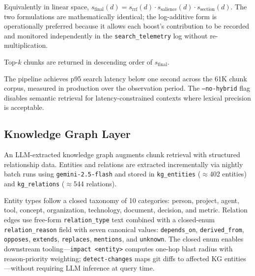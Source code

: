 Equivalently in linear space,
$s_{\text{final}}(d) = s_{\text{rrf}}(d) \cdot s_{\text{salience}}(d) \cdot s_{\text{section}}(d)$.
The two formulations are mathematically identical; the log-additive form is operationally
preferred because it allows each boost's contribution to be recorded and monitored
independently in the \texttt{search\_telemetry} log without re-multiplication.

Top-$k$ chunks are returned in descending order of $s_{\text{final}}$.

The pipeline achieves p95 search latency below one second across the 61K chunk corpus,
measured in production over the observation period. The \texttt{--no-hybrid} flag disables
semantic retrieval for latency-constrained contexts where lexical precision is acceptable.

\subsection{Knowledge Graph Layer}

An LLM-extracted knowledge graph augments chunk retrieval with structured relationship
data. Entities and relations are extracted incrementally via nightly batch runs using
\texttt{gemini-2.5-flash} and stored in \texttt{kg\_entities} ($\approx$402 entities) and
\texttt{kg\_relations} ($\approx$544 relations).

Entity types follow a closed taxonomy of 10 categories: person, project, agent, tool,
concept, organization, technology, document, decision, and metric. Relation edges use
free-form \texttt{relation\_type} text combined with a closed-enum
\texttt{relation\_reason} field with seven canonical values: \texttt{depends\_on},
\texttt{derived\_from}, \texttt{opposes}, \texttt{extends}, \texttt{replaces},
\texttt{mentions}, and \texttt{unknown}. The closed enum enables downstream
tooling---\texttt{impact~\textless entity\textgreater} computes one-hop blast radius with
reason-priority weighting; \texttt{detect-changes} maps git diffs to affected KG
entities---without requiring LLM inference at query time.

